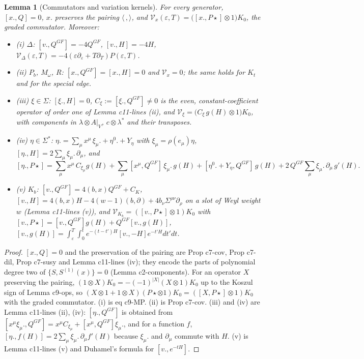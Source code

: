 \documentclass[11pt]{article}
\numberwithin{equation}{section}
\theoremstyle{plain}
\newtheorem{lemma}[theorem]{Lemma}
\theoremstyle{definition}
\newcommand{\Pst}{P\star}
\newcommand{\Var}{\mathcal V}
\begin{document}
\begin{lemma}[Commutators and variation kernels]
\label{lem:op-comm}
For every generator, $[x.,Q]=0$, $x.$ preserves the pairing $\langle\,,\rangle$, and $\Var_x(\varepsilon,T)=\big([x.,\Pst]\otimes1\big)K_0$, the graded commutator. Moreover:
\begin{itemize}
\item (i) $\Delta$: $[v.,Q^{GF}]=-4Q^{GF}$, $[v.,H]=-4H$, $\Var_\Delta(\varepsilon,T)=-4(\varepsilon\partial_\varepsilon+T\partial_T)P(\varepsilon,T)$.
\item (ii) $P_b$, $M_\omega$, $R$: $[x.,Q^{GF}]=[x.,H]=0$ and $\Var_x=0$; the same holds for $K_t$ and for the special edge.
\item (iii) $\xi\in\Sigma$: $[\xi.,H]=0$, $C_\xi:=[\xi.,Q^{GF}]\neq0$ is the even, constant-coefficient operator of order one of Lemma c11-lines (ii), and $\Var_\xi=\big(C_\xi\,g(H)\otimes1\big)K_0$, with components in $\lambda\otimes A|_V$, $c\otimes\lambda^*$ and their transposes.
\item (iv) $\eta\in\Sigma^*$: $\eta.=\sum_\mu x^\mu\,\xi_\mu.+\eta^0.+Y_\eta$ with $\xi_\mu=\rho(e_\mu)\eta$, $[\eta.,H]=2\sum_\mu\xi_\mu.\,\partial_\mu$, and
\[
[\eta.,\Pst]=\sum_\mu x^\mu\,C_{\xi_\mu}g(H)+\sum_\mu[x^\mu,Q^{GF}]\,\xi_\mu.\,g(H)+[\eta^0.+Y_\eta,Q^{GF}]\,g(H)+2\,Q^{GF}\sum_\mu\xi_\mu.\,\partial_\mu\,g'(H).
\]
\item (v) $K_b$: $[v.,Q^{GF}]=4(b,x)Q^{GF}+C_K$, $[v.,H]=4(b,x)H-4(w-1)(b,\partial)+4b_\nu\Sigma^{\rho\nu}\partial_\rho$ on a slot of Weyl weight $w$ (Lemma c11-lines (v)), and $\Var_{K_b}=([v.,\Pst]\otimes1)K_0$ with $[v.,\Pst]=[v.,Q^{GF}]g(H)+Q^{GF}[v.,g(H)]$, $[v.,g(H)]=\int_\varepsilon^T\int_0^te^{-(t-t')H}[v.,-H]e^{-t'H}dt'dt$.
\end{itemize}
\end{lemma}

\begin{proof}
$[x.,Q]=0$ and the preservation of the pairing are Prop c7-cov, Prop c7-dil, Prop c7-susy and Lemma c11-lines (iv); they encode the parts of polynomial degree two of $\{S,S^{(1)}(x)\}=0$ (Lemma c2-components). For an operator $X$ preserving the pairing, $(1\otimes X)K_0=-(-1)^{|X|}(X\otimes1)K_0$ up to the Koszul sign of Lemma c9-ops, so $(X\otimes1+1\otimes X)(\Pst\otimes1)K_0=([X,\Pst]\otimes1)K_0$ with the graded commutator. (i) is eq c9-MP. (ii) is Prop c7-cov. (iii) and (iv) are Lemma c11-lines (ii), (iv): $[\eta.,Q^{GF}]$ is obtained from $[x^\mu\xi_\mu.,Q^{GF}]=x^\mu C_{\xi_\mu}+[x^\mu,Q^{GF}]\xi_\mu.$, and for a function $f$, $[\eta.,f(H)]=2\sum_\mu\xi_\mu.\,\partial_\mu f'(H)$ because $\xi_\mu.$ and $\partial_\mu$ commute with $H$. (v) is Lemma c11-lines (v) and Duhamel's formula for $[v.,e^{-tH}]$.
\end{proof}
\end{document}
